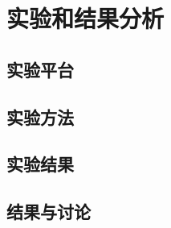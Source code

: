
\chapter{实验和结果分析}
\label{cha:exp_analysis}


\section{实验平台}
\label{sec:exp_platform}


\section{实验方法}
\label{sec:exp_method}


\section{实验结果}
\label{sec:exp_results}


\section{结果与讨论}
\label{sec:results_and_comparation}

